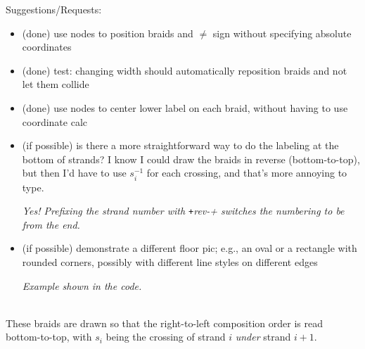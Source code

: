 \documentclass{article}
\begin{document}
Suggestions/Requests:
\begin{itemize}
\item (done) use nodes to position braids and $\not =$ sign without specifying absolute coordinates
\item (done) test: changing width should automatically reposition braids and not let them collide
\item (done) use nodes to center lower label on each braid, without having to use coordinate calc
\item (if possible) is there a more straightforward way to do the labeling at the bottom of strands?  I know I could draw the braids in reverse (bottom-to-top), but then I'd have to use $s^{-1}_i$ for each crossing, and that's more annoying to type.

\emph{Yes! Prefixing the strand number with \texttt+rev-+ switches the numbering to be from the end.}
\item (if possible) demonstrate a different floor pic; e.g., an oval or a rectangle with rounded corners, possibly with different line styles on different edges

\emph{Example shown in the code.}
\end{itemize}
\ \\

These braids are drawn so that the right-to-left composition order is read bottom-to-top, with $s_i$ being the crossing of strand $i$ \emph{under} strand $i+1$.
\\
\end{document}

